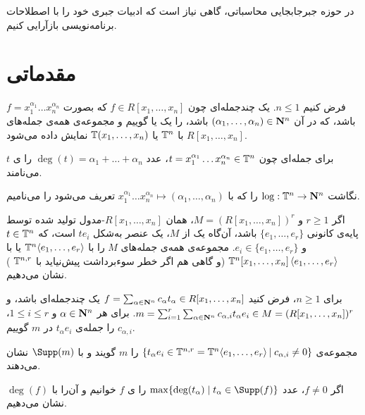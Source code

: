 
در حوزه جبرجابجایی محاسباتی، گاهی نیاز است که ادبیات جبری خود را با اصطلاحات برنامه‌نویسی بازآرایی کنیم.
\section{مقدماتی}
فرض کنیم
$n\le 1$.
یک چندجمله‌ای چون
$f\in R[x_1,\dots,x_n]$
که بصورت
$f=x_1^{\alpha_1}\dots x_n^{\alpha_n}$
باشد، که در آن 
$(\alpha_1,\dots,\alpha_n)\in{\bf N}^n$
باشد، را یک  یا  گوییم و مجموعه‌ی همه‌ی جمله‌های 
$R[x_1,\dots,x_n]$
با
${\Bbb T}^n$ 
یا
${\Bbb T}(x_1,\dots,x_n)$
نمایش داده می‌شود.

برای جمله‌ای چون
$t=x_1^{\alpha_1}\dots x_n^{\alpha_n}\in{\Bbb T}^n$،
عدد
$\deg(t)=\alpha_1+\dots+\alpha_n$
را ی $t$ می‌نامند.

نگاشت
$\log:{\Bbb T}^n\to{\bf N}^n$
را که با 
$x_1^{\alpha_1}\dots x_n^{\alpha_n}\mapsto(\alpha_1,\dots,\alpha_n)$
تعریف می‌شود را  می‌نامیم.

اگر
$r\ge 1$
و
$M=(R[x_1,\dots,x_n])^r$،
همان $R[x_1,\dots,x_n]$-مدول تولید شده توسط پایه‌ی کانونی
$\{e_1,\dots,e_r\}$
باشد، آن‌گاه یک   از $M$، یک عنصر به‌شکل
$te_i$
است، که 
$t\in{\Bbb T}^n$
و
$e_i\in\{e_1,\dots,e_r\}$.
مجموعه‌ی همه‌ی جمله‌های $M$ را با
${\Bbb T}^n\!\left<e_1,\dots,e_r\right>$
یا با
${\Bbb T}^n[x_1,\dots,x_n]\left<e_1,\dots,e_r\right>$
(و گاهی هم اگر خطر سوءبرداشت پیش‌نیاید با
${\Bbb T}^{n,r}$
)
نشان می‌دهیم.

برای $n\ge1$، فرض کنید 
$f=\sum_{\alpha\in{\bf N}^n}c_\alpha t_\alpha\in R[x_1,\dots,x_n]$
یک چندجمله‌ای باشد، و
$m=\sum_{i=1}^r\sum_{\alpha\in{\bf N}^n}c_{\alpha,i} t_\alpha e_i\in M=(R[x_1,\dots,x_n])^r$.
برای هر
$\alpha\in{\bf N}^n$
و 
$1\le i\le r$،
$c_{\alpha,i}$
را  جمله‌ی $t_\alpha e_i$ در $m$ گوییم.

مجموعه‌ی
$\{t_\alpha e_i\in {\Bbb T}^{n,r}={\Bbb T}^n\!\left<e_1,\dots,e_r\right>|\; c_{\alpha,i}\ne 0\}$
را  $m$ گویند و با
$\Supp(m)$
نشان می‌دهند.

اگر 
$f\ne 0$،
عدد 
$\max\{\deg(t_\alpha)\;|\;t_\alpha\in\Supp(f)\}$
را ی $f$ خوانیم و آن‌را با
$\deg(f)$
نشان می‌دهیم.
